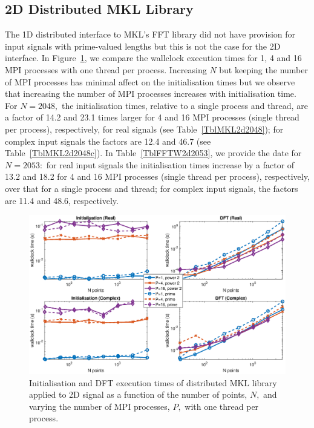 \documentclass[a4paper]{article}
\begin{document}
\subsection{2D Distributed MKL Library}\label{Sec:2DDistMKL}
The 1D distributed interface to MKL's FFT library did not have
provision for input signals with prime-valued lengths but this is not
the case for the 2D interface. In Figure~\ref{2DDistMKL}, we compare
the wallclock execution times for 1, 4 and 16 MPI processes with one
thread per process. Increasing $N$ but keeping the number of MPI
processes has minimal affect on the initialisation times but we
observe that increasing the number of MPI processes increases with
initialisation time. For $N=2048,$ the initialisation times, relative
to a single process and thread, are a factor of 14.2 and 23.1 times
larger for 4 and 16 MPI processes (single thread per process),
respectively, for real signals (see Table~\ref{TblMKL2d2048}); for
complex input signals the factors are 12.4 and 46.7 (see
Table~\ref{TblMKL2d2048c}). In Table~\ref{TblFFTW2d2053}, we provide
the date for $N=2053:$ for real input signals the initialisation times
increase by a factor of 13.2 and 18.2 for 4 and 16 MPI processes
(single thread per process), respectively, over that for a single
process and thread; for complex input signals, the factors are 11.4
and 48.6, respectively.


\begin{figure}[htb]
    \centering
    \includegraphics[width=0.9\linewidth]{../results/mkl_2d_mpi.eps}
  \caption{Initialisation and DFT execution times of distributed MKL library applied to 2D signal as a function of the
    number of points, $N,$ and varying the number of MPI processes, $P,$ with one thread per process.}
  \label{2DDistMKL}
\end{figure}
\end{document}
